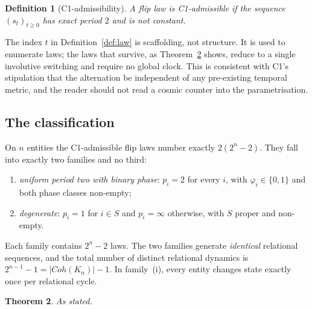 \documentclass[11pt,a4paper]{article}
\def\mathrm#1{#1}%
\newtheorem{theorem}{Theorem}[section]
\newtheorem{definition}[theorem]{Definition}
\newcommand{\Kn}{K_n}
\newcommand{\Coh}{\mathrm{Coh}}
\begin{document}
\begin{definition}[C1-admissibility]
A flip law is \emph{C1-admissible} if the sequence $(s_t)_{t\ge0}$ has exact period $2$ and is not constant.
\end{definition}

The index $t$ in Definition~\ref{def:law} is scaffolding, not structure. It is used to enumerate laws; the laws that survive, as Theorem~\ref{thm:classification} shows, reduce to a single involutive switching and require no global clock. This is consistent with C1's stipulation that the alternation be independent of any pre-existing temporal metric, and the reader should not read a cosmic counter into the parametrisation.

\subsection{The classification}

\begin{theorembox}
On $n$ entities the C1-admissible flip laws number exactly $2(2^n-2)$. They fall into exactly two families and no third:
\begin{enumerate}
\item[(i)] \emph{uniform period two with binary phase}: $p_i=2$ for every $i$, with $\varphi_i\in\{0,1\}$ and both phase classes non-empty;
\item[(ii)] \emph{degenerate}: $p_i=1$ for $i\in S$ and $p_i=\infty$ otherwise, with $S$ proper and non-empty.
\end{enumerate}
Each family contains $2^n-2$ laws. The two families generate \emph{identical} relational sequences, and the total number of distinct relational dynamics is $2^{n-1}-1=|\Coh(\Kn)|-1$. In family~(i), every entity changes state exactly once per relational cycle.
\end{theorembox}

\begin{theorem}
\label{thm:classification}
As stated.
\end{theorem}
\end{document}
